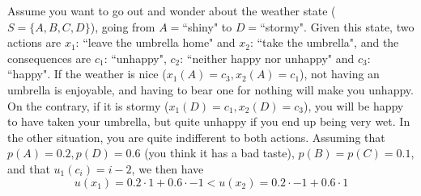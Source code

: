 \documentclass[french, english]{llncs}
\begin{document}
	\begin{example}\label{exm:DMU}
		Assume you want to go out and wonder about the weather state ($S=\{A,B,C,D\}$), going from $A=$``shiny" to $D=$``stormy". Given this state, two actions are $x_1$: ``leave the umbrella home" and $x_2$: ``take the umbrella", and the consequences are $c_1$: ``unhappy", $c_2$: ``neither happy nor unhappy" and $c_3$: ``happy". If the weather is nice ($x_1(A)=c_3,x_2(A)=c_1$), not having an umbrella is enjoyable,  and having to bear one for nothing will make you unhappy. On the contrary, if it is stormy ($x_1(D)=c_1,x_2(D)=c_3$), you will be happy to have taken your umbrella, but quite unhappy if you end up being very wet. In the other situation, you are quite indifferent to both actions. Assuming that $p(A)=0.2, p(D)=0.6$ (you think it has a bad taste), $p(B)=p(C)=0.1$, and that $u_1(c_i)=i-2$, we then have
		$$u(x_1)=0.2 \cdot 1 + 0.6 \cdot -1 <  u(x_2)=0.2 \cdot -1 + 0.6 \cdot 1$$
	\end{example}
	
\end{document}
